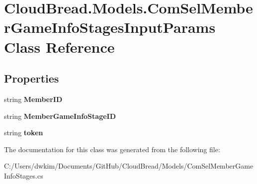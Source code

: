 \hypertarget{a00060}{}\section{Cloud\+Bread.\+Models.\+Com\+Sel\+Member\+Game\+Info\+Stages\+Input\+Params Class Reference}
\label{a00060}
\subsection*{Properties}
\begin{DoxyCompactItemize}
\item 
string {\bfseries Member\+ID}\hypertarget{a00060_a50431f69daed8c937ad8c3f7cdf29055}{}\label{a00060_a50431f69daed8c937ad8c3f7cdf29055}

\item 
string {\bfseries Member\+Game\+Info\+Stage\+ID}\hypertarget{a00060_a2f3d1384c88c08d21cd982ade426b89d}{}\label{a00060_a2f3d1384c88c08d21cd982ade426b89d}

\item 
string {\bfseries token}\hypertarget{a00060_a308bf9d8d4c06162e070c1488785b110}{}\label{a00060_a308bf9d8d4c06162e070c1488785b110}

\end{DoxyCompactItemize}


The documentation for this class was generated from the following file\+:\begin{DoxyCompactItemize}
\item 
C\+:/\+Users/dwkim/\+Documents/\+Git\+Hub/\+Cloud\+Bread/\+Models/Com\+Sel\+Member\+Game\+Info\+Stages.\+cs\end{DoxyCompactItemize}
